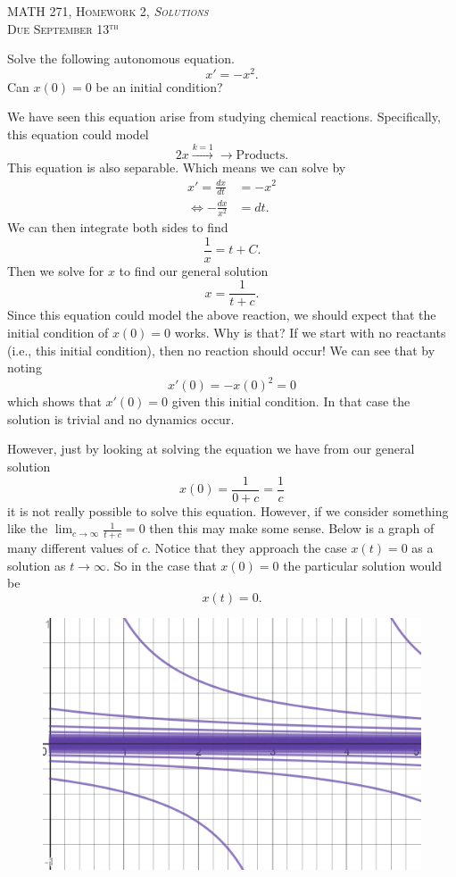 \documentclass[12pt]{article} %
\begin{document}
\begin{center}
   \textsc{\large MATH 271, Homework 2, \emph{Solutions}}\\
   \textsc{Due September 13$^\textrm{th}$}
\end{center}
\vspace{.5cm}

\begin{problem}
    Solve the following autonomous equation.
    \[
    x'=-x^2.
    \]
    Can $x(0)=0$ be an initial condition?
\end{problem}
\begin{solution}
We have seen this equation arise from studying chemical reactions.  Specifically, this equation could model
\[
2x \xrightarrow{k=1} \to \textrm{Products}.
\]
This equation is also separable.  Which means we can solve by
\begin{align*}
    x'=\frac{dx}{dt}&=-x^2\\
    \iff -\frac{dx}{x^2}&=dt.
\end{align*}
We can then integrate both sides to find
\[
\frac{1}{x}=t+C.
\]
Then we solve for $x$ to find our general solution
\[
\boxed{x=\frac{1}{t+c}.}
\]
Since this equation could model the above reaction, we should expect that the initial condition of $x(0)=0$ works. Why is that? If we start with no reactants (i.e., this initial condition), then no reaction should occur!  We can see that by noting
\[
x'(0)=-x(0)^2=0
\]
which shows that $x'(0)=0$ given this initial condition.  In that case the solution is trivial and no dynamics occur.

However, just by looking at solving the equation we have from our general solution
\[
x(0)=\frac{1}{0+c}=\frac{1}{c}
\]
it is not really possible to solve this equation. However, if we consider something like the $\lim_{c\to \infty} \frac{1}{t+c}=0$ then this may make some sense.  Below is a graph of many different values of $c$. Notice that they approach the case $x(t)=0$ as a solution as $t\to \infty$. So in the case that $x(0)=0$ the particular solution would be
\[
\boxed{x(t)=0.}
\]
\begin{figure}[H]
    \centering
    \includegraphics[width=\textwidth]{Homework_2/2nd_order_chem.png}
\end{figure}
\end{solution}
\end{document}
